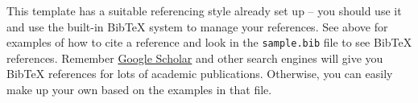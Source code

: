 This template has a suitable referencing style already set up -- you should use it and use the built-in BibTeX system to manage your references. See above for examples of how to cite a reference and look in the \texttt{sample.bib} file to see BibTeX references. Remember \href{http://scholar.google.com}{Google Scholar} and other search engines will give you BibTeX references for lots of academic publications. Otherwise, you can easily make up your own based on the examples in that file.